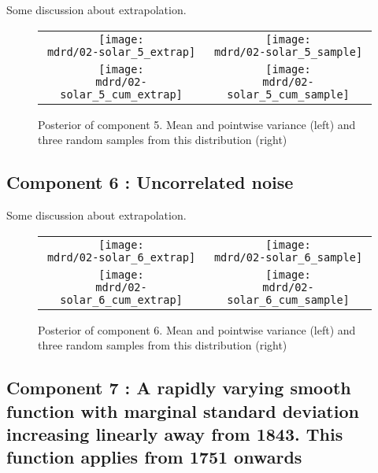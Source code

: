 \documentclass{article} %
\begin{document}
Some discussion about extrapolation.

\begin{figure}[H]
\newcommand{\wmgd}{0.5\columnwidth}
\newcommand{\hmgd}{3.0cm}
\newcommand{\mdrd}{figures/02-solar}
\newcommand{\mbm}{\hspace{-0.3cm}}
\begin{tabular}{cc}
\mbm \texttt{[image: \\mdrd/02-solar\_5\_extrap]} & \texttt{[image: \\mdrd/02-solar\_5\_sample]} \\
\mbm \texttt{[image: \\mdrd/02-solar\_5\_cum\_extrap]} & \texttt{[image: \\mdrd/02-solar\_5\_cum\_sample]}
\end{tabular}
\caption{Posterior of component 5. Mean and pointwise variance (left) and three random samples from this distribution (right)}
\label{fig:extrap5}
\end{figure}

\subsection{Component 6 : Uncorrelated noise}

Some discussion about extrapolation.

\begin{figure}[H]
\newcommand{\wmgd}{0.5\columnwidth}
\newcommand{\hmgd}{3.0cm}
\newcommand{\mdrd}{figures/02-solar}
\newcommand{\mbm}{\hspace{-0.3cm}}
\begin{tabular}{cc}
\mbm \texttt{[image: \\mdrd/02-solar\_6\_extrap]} & \texttt{[image: \\mdrd/02-solar\_6\_sample]} \\
\mbm \texttt{[image: \\mdrd/02-solar\_6\_cum\_extrap]} & \texttt{[image: \\mdrd/02-solar\_6\_cum\_sample]}
\end{tabular}
\caption{Posterior of component 6. Mean and pointwise variance (left) and three random samples from this distribution (right)}
\label{fig:extrap6}
\end{figure}

\subsection{Component 7 : A rapidly varying smooth function with marginal standard deviation increasing linearly away from 1843. This function applies from 1751 onwards}
\end{document}
